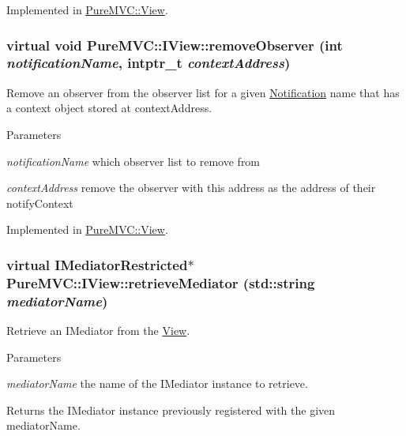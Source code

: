 Implemented in \hyperlink{class_pure_m_v_c_1_1_view_a015fe15ee362685fdb72584019417b5d}{PureMVC::View}.\hypertarget{class_pure_m_v_c_1_1_i_view_a0e97969101608e8486b964b3888dd0e6}{
\subsubsection[{removeObserver}]{\setlength{\rightskip}{0pt plus 5cm}virtual void PureMVC::IView::removeObserver (int {\em notificationName}, \/  intptr\_\-t {\em contextAddress})}}
\label{class_pure_m_v_c_1_1_i_view_a0e97969101608e8486b964b3888dd0e6}


Remove an observer from the observer list for a given \hyperlink{class_pure_m_v_c_1_1_notification}{Notification} name that has a context object stored at {\ttfamily contextAddress}. 
\begin{DoxyParams}{Parameters}
\item[{\em notificationName}]which observer list to remove from \item[{\em contextAddress}]remove the observer with this address as the address of their notifyContext \end{DoxyParams}


Implemented in \hyperlink{class_pure_m_v_c_1_1_view_a950c0a587a04909a8301f236f8501de2}{PureMVC::View}.\hypertarget{class_pure_m_v_c_1_1_i_view_abf6f388473042970e62d52705b1448dc}{
\subsubsection[{retrieveMediator}]{\setlength{\rightskip}{0pt plus 5cm}virtual {\bf IMediatorRestricted}$\ast$ PureMVC::IView::retrieveMediator (std::string {\em mediatorName})}}
\label{class_pure_m_v_c_1_1_i_view_abf6f388473042970e62d52705b1448dc}


Retrieve an {\ttfamily IMediator} from the {\ttfamily \hyperlink{class_pure_m_v_c_1_1_view}{View}}. 
\begin{DoxyParams}{Parameters}
\item[{\em mediatorName}]the name of the {\ttfamily IMediator} instance to retrieve. \end{DoxyParams}
\begin{DoxyReturn}{Returns}
the {\ttfamily IMediator} instance previously registered with the given {\ttfamily mediatorName}. 
\end{DoxyReturn}


